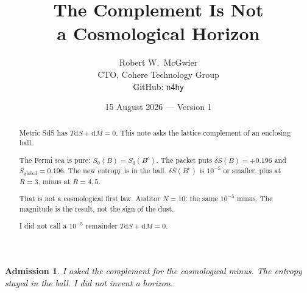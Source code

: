 \documentclass[11pt]{article}
\title{\textbf{The Complement Is Not\\
a Cosmological Horizon}}
\author{Robert W.\ McGwier\\
\small CTO, Cohere Technology Group\\
\small GitHub: \texttt{n4hy}}
\date{15 August 2026 --- Version 1}
\newtheorem*{admission}{Admission}
\begin{document}
\maketitle

\begin{abstract}
\noindent
Metric SdS has $T\mathrm{d}S+\mathrm{d}M=0$. This note
asks the lattice complement of an enclosing ball.

The Fermi sea is pure: $S_0(B)=S_0(B^c)$. The packet
puts $\delta S(B)=+0.196$ and
$S_{\mathrm{global}}=0.196$. The new entropy is in
the ball. $\delta S(B^c)$ is $10^{-5}$ or smaller,
plus at $R=3$, minus at $R=4,5$.

That is not a cosmological first law. Auditor
$N=10$: the same $10^{-5}$ minus. The magnitude
is the result, not the sign of the dust.

I did not call a $10^{-5}$ remainder $T\mathrm{d}S+\mathrm{d}M=0$.
\end{abstract}

\begin{admission}
I asked the complement for the cosmological minus.
The entropy stayed in the ball. I did not invent a
horizon.
\end{admission}
\end{document}
